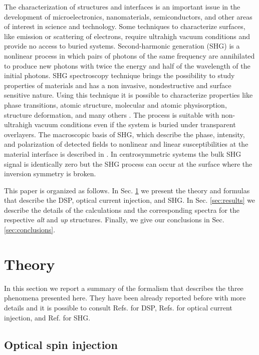 \documentclass[pss]{wiley2sp} %
\begin{document}
The characterization of structures and interfaces is an important issue in the development of microelectronics, nanomaterials, semiconductors, and other areas of interest in science and technology. Some techniques to characterize surfaces, like emission or scattering of electrons, require ultrahigh vacuum conditions and provide no access to buried systems. Second-harmonic generation (SHG) is a nonlinear process in which pairs of photons of the same frequency are annihilated to produce new photons with twice the energy and half of the wavelength of the initial photons. SHG spectroscopy technique brings the possibility to study properties of materials and has a non invasive, nondestructive and surface sensitive nature. Using this technique it is possible to characterize properties like phase transitions, atomic structure, molecular and atomic physisorption, structure deformation, and many others \cite{dadapPRB97,godefroyAPL96,salazarPRB14,mendozaPRL98}. The process is suitable with non-ultrahigh vacuum conditions even if the system is buried under transparent overlayers. The macroscopic basis of SHG, which describe the phase, intensity, and polarization of detected fields to nonlinear and linear susceptibilities at the material interface is described in \cite{downerSIA01}. In centrosymmetric systems the bulk SHG signal is identically zero but the SHG process can occur at the surface where the inversion symmetry is broken.  

This paper is organized as follows. In Sec. \ref{sec:theory} we present the theory and formulas that describe the DSP, optical current injection, and SHG. In Sec. \ref{sec:results} we describe the details of the calculations and the corresponding spectra for the respective \emph{alt} and \emph{up} structures. Finally, we give our conclusions in Sec. \ref{sec:conclusions}.


\section{Theory}\label{sec:theory}

In this section we report a summary of the formalism that describes the three phenomena presented here. They have been already reported before with more details and it is possible to consult Refs. \cite{nastosPRB07,mendozaPRB12} for DSP, Refs. \cite{cabellosPRB11,sipePRB00} for optical current injection, and Ref. \cite{andersonPRB15} for SHG.


\subsection{Optical spin injection}\label{sec:theory-DSP}
\end{document}
